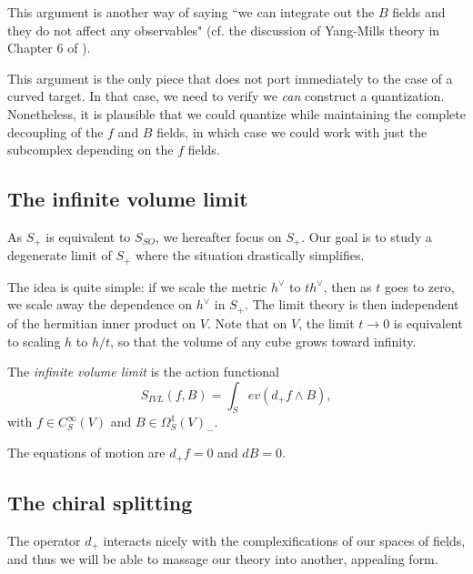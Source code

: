 This argument is another way of saying ``we can integrate out the $B$ fields and they do not affect any observables" (cf. the discussion of Yang-Mills theory in Chapter 6 of \cite{CosBook}).

\begin{rmk}
This argument is the only piece that does not port immediately to the case of a curved target. In that case, we need to verify we {\em can} construct a quantization. Nonetheless, it is plausible that we could quantize while maintaining the complete decoupling of the $f$ and $B$ fields, in which case we could work with just the subcomplex depending on the $f$ fields.
\end{rmk}

\subsection{The infinite volume limit}

As $S_+$ is equivalent to $S_{SO}$, we hereafter focus on $S_+$. Our goal is to study a degenerate limit of $S_+$ where the situation drastically simplifies.

The idea is quite simple: if we scale the metric $h^\vee$ to $t h^\vee$, then as $t$ goes to zero, we scale away the dependence on $h^\vee$ in $S_+$. The limit theory is then independent of the hermitian inner product on $V$. Note that on $V$, the limit $t \to 0$ is equivalent to scaling $h$ to $h/t$, so that the volume of any cube grows toward infinity.

\begin{dfn}
The {\em infinite volume limit} is the action functional
\[
S_{IVL}(f,B) = \int_S ev(d_+ f \wedge B),
\]
with $f \in C^\infty_S(V)$ and $B \in \Omega^1_S(V)_-$.
\end{dfn}

The equations of motion are $d_+ f = 0$ and $dB = 0$. 

\subsection{The chiral splitting}

The operator $d_+$ interacts nicely with the complexifications of our spaces of fields, and thus we will be able to massage our theory into another, appealing form.


